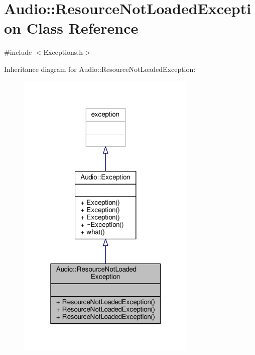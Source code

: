 \hypertarget{classAudio_1_1ResourceNotLoadedException}{}\section{Audio\+:\+:Resource\+Not\+Loaded\+Exception Class Reference}
\label{classAudio_1_1ResourceNotLoadedException}


{\ttfamily \#include $<$Exceptions.\+h$>$}



Inheritance diagram for Audio\+:\+:Resource\+Not\+Loaded\+Exception\+:
\nopagebreak
\begin{figure}[H]
\begin{center}
\leavevmode
\includegraphics[width=244pt]{d0/db5/classAudio_1_1ResourceNotLoadedException__inherit__graph}
\end{center}
\end{figure}


